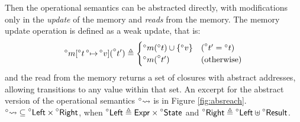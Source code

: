 \documentclass[acmsmall,review]{acmart}\settopmatter{printfolios=true,printccs=false,printacmref=false}
\theoremstyle{definition}
\theoremstyle{plain}
\newcommand*{\A}[1]{\prescript{\circ}{}{#1}}
\newcommand*{\Expr}{\mathsf{Expr}}
\newcommand*{\Left}{\mathsf{Left}}
\newcommand*{\Right}{\mathsf{Right}}
\newcommand*{\mem}{m}
\newcommand*{\State}{\mathsf{State}}
\newcommand*{\Result}{\mathsf{Result}}
\newcommand*{\semarrow}{\rightsquigarrow}
\begin{document}
Then the operational semantics can be abstracted directly, with modifications only in the \emph{update} of the memory and \emph{reads} from the memory.
The memory update operation is defined as a weak update, that is:
\[
  \A{\mem}[\A{t}\A{\mapsto}\A{v}](\A{t'})\triangleq
  \begin{cases}
    \A{\mem}(\A{t})\cup\{\A{v}\} & (\A{t'}=\A{t})     \\
    \A{\mem}(\A{t'})             & (\text{otherwise})
  \end{cases}
\]
and the read from the memory returns a set of closures with abstract addresses, allowing transitions to any value within that set.
An excerpt for the abstract version of the operational semantics $\A\semarrow$ is in Figure \ref{fig:absreach}.
$\A\semarrow\subseteq\A\Left\times\A\Right$, when $\A\Left\triangleq\Expr\times\A\State$ and $\A\Right\triangleq\A\Left\uplus\A\Result$.
\end{document}
